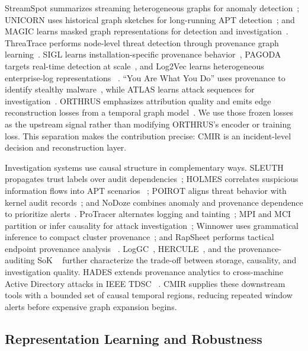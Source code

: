\documentclass[lettersize,journal]{IEEEtran}
\newcommand{\method}{CMIR}
\begin{document}
StreamSpot summarizes streaming heterogeneous graphs for anomaly
detection~\cite{manzoor2016streamspot}; UNICORN uses historical graph sketches
for long-running APT detection~\cite{han2020unicorn}; and MAGIC learns masked
graph representations for detection and investigation~\cite{jia2024magic}.
ThreaTrace performs node-level threat detection through provenance graph
learning~\cite{wang2022threatrace}.
SIGL learns installation-specific provenance behavior~\cite{han2021sigl},
PAGODA targets real-time detection at scale~\cite{xie2020pagoda}, and
Log2Vec learns heterogeneous enterprise-log representations
~\cite{liu2019log2vec}.  ``You Are What You Do'' uses provenance to identify
stealthy malware~\cite{wang2020yawyd}, while ATLAS learns attack sequences for
investigation~\cite{alsaheel2021atlas}.
ORTHRUS emphasizes attribution quality and emits edge reconstruction losses from
a temporal graph model~\cite{jiang2025orthrus}.  We use those frozen losses as
the upstream signal rather than modifying ORTHRUS's encoder or training loss.
This separation makes the contribution precise: \method{} is an incident-level
decision and reconstruction layer.

Investigation systems use causal structure in complementary ways.  SLEUTH
propagates trust labels over audit dependencies~\cite{hossain2017sleuth}; HOLMES
correlates suspicious information flows into APT scenarios
~\cite{milajerdi2019holmes}; POIROT aligns threat behavior with kernel audit
records~\cite{milajerdi2019poirot}; and NoDoze combines anomaly and provenance
dependence to prioritize alerts~\cite{hassan2019nodoze}.  ProTracer alternates
logging and tainting~\cite{ma2016protracer}; MPI and MCI partition or infer
causality for attack investigation~\cite{ma2017mpi,kwon2018mci}; Winnower uses
grammatical inference to compact cluster provenance~\cite{hassan2018winnower};
and RapSheet performs tactical endpoint provenance analysis
~\cite{hassan2020rapsheet}.  LogGC~\cite{lee2013loggc},
HERCULE~\cite{pei2016hercule}, and the provenance-auditing SoK
~\cite{inam2023sok} further characterize the trade-off between storage,
causality, and investigation quality.  HADES extends provenance analytics to
cross-machine Active Directory attacks in IEEE TDSC
~\cite{liu2026hades}.  \method{} supplies these downstream tools with a bounded
set of causal temporal regions, reducing repeated window alerts before expensive
graph expansion begins.

\subsection{Representation Learning and Robustness}
\end{document}
